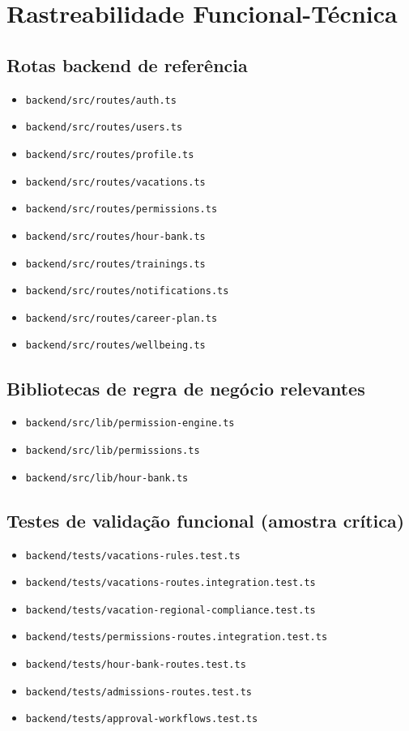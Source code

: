 \documentclass[11pt,a4paper,twoside]{article}
\begin{document}
\section{Rastreabilidade Funcional-Técnica}

\subsection{Rotas backend de referência}
\begin{itemize}
  \item \texttt{backend/src/routes/auth.ts}
  \item \texttt{backend/src/routes/users.ts}
  \item \texttt{backend/src/routes/profile.ts}
  \item \texttt{backend/src/routes/vacations.ts}
  \item \texttt{backend/src/routes/permissions.ts}
  \item \texttt{backend/src/routes/hour-bank.ts}
  \item \texttt{backend/src/routes/trainings.ts}
  \item \texttt{backend/src/routes/notifications.ts}
  \item \texttt{backend/src/routes/career-plan.ts}
  \item \texttt{backend/src/routes/wellbeing.ts}
\end{itemize}

\subsection{Bibliotecas de regra de negócio relevantes}
\begin{itemize}
  \item \texttt{backend/src/lib/permission-engine.ts}
  \item \texttt{backend/src/lib/permissions.ts}
  \item \texttt{backend/src/lib/hour-bank.ts}
\end{itemize}

\subsection{Testes de validação funcional (amostra crítica)}
\begin{itemize}
  \item \texttt{backend/tests/vacations-rules.test.ts}
  \item \texttt{backend/tests/vacations-routes.integration.test.ts}
  \item \texttt{backend/tests/vacation-regional-compliance.test.ts}
  \item \texttt{backend/tests/permissions-routes.integration.test.ts}
  \item \texttt{backend/tests/hour-bank-routes.test.ts}
  \item \texttt{backend/tests/admissions-routes.test.ts}
  \item \texttt{backend/tests/approval-workflows.test.ts}
\end{itemize}
\end{document}
